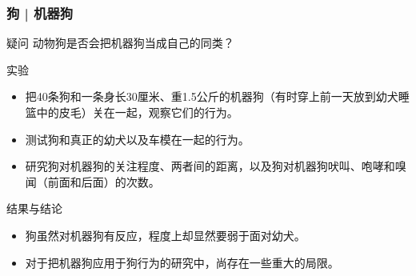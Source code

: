\begin{frame}
  \frametitle{狗 | 机器狗}
  \begin{block}{疑问}
    动物狗是否会把机器狗当成自己的同类？
  \end{block}
  \pause
  \begin{block}{实验}
    \begin{itemize}
      \item 把40条狗和一条身长30厘米、重1.5公斤的机器狗（有时穿上前一天放到幼犬睡篮中的皮毛）关在一起，观察它们的行为。
      \item 测试狗和真正的幼犬以及车模在一起的行为。
      \item 研究狗对机器狗的关注程度、两者间的距离，以及狗对机器狗吠叫、咆哮和嗅闻（前面和后面）的次数。
    \end{itemize}
  \end{block}
  \pause
  \begin{block}{结果与结论}
    \begin{itemize}
      \item 狗虽然对机器狗有反应，程度上却显然要弱于面对幼犬。
      \item 对于把机器狗应用于狗行为的研究中，尚存在一些重大的局限。
    \end{itemize}
  \end{block}
\end{frame}

% 
\section{}


